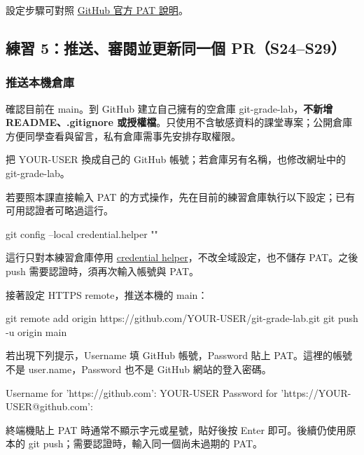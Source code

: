 \documentclass[11pt,a4paper]{article}
\DeclareRobustCommand{\code}[1]{{\small\ttfamily #1}}
\begin{document}
設定步驟可對照 \href{https://docs.github.com/en/authentication/keeping-your-account-and-data-secure/managing-your-personal-access-tokens}{GitHub 官方 PAT 說明}。
\clearpage

\subsection{練習 5：推送、審閱並更新同一個 PR（S24–S29）}

\subsubsection{推送本機倉庫}

確認目前在 \code{main}。到 GitHub 建立自己擁有的空倉庫 \code{git-grade-lab}，\textbf{不新增 README、\code{.gitignore} 或授權檔}。只使用不含敏感資料的課堂專案；公開倉庫方便同學查看與留言，私有倉庫需事先安排存取權限。

{\sloppy
把 \code{YOUR-USER} 換成自己的 GitHub 帳號；若倉庫另有名稱，也修改網址中的 \code{git-grade-lab}。\par
}

若要照本課直接輸入 PAT 的方式操作，先在目前的練習倉庫執行以下設定；已有可用認證者可略過這行。

\begin{Code}
git config --local credential.helper ""
\end{Code}

這行只對本練習倉庫停用 \href{https://git-scm.com/docs/gitcredentials#_configuration_options}{credential helper}，不改全域設定，也不儲存 PAT。之後 \code{push} 需要認證時，須再次輸入帳號與 PAT。

接著設定 HTTPS remote，推送本機的 \code{main}：

\begin{Code}
git remote add origin https://github.com/YOUR-USER/git-grade-lab.git
git push -u origin main
\end{Code}

若出現下列提示，Username 填 GitHub 帳號，Password 貼上 PAT。這裡的帳號不是 \code{user.name}，Password 也不是 GitHub 網站的登入密碼。

\begin{Code}
Username for 'https://github.com': YOUR-USER
Password for 'https://YOUR-USER@github.com':
\end{Code}

終端機貼上 PAT 時通常不顯示字元或星號，貼好後按 Enter 即可。後續仍使用原本的 \code{git push}；需要認證時，輸入同一個尚未過期的 PAT。
\end{document}
